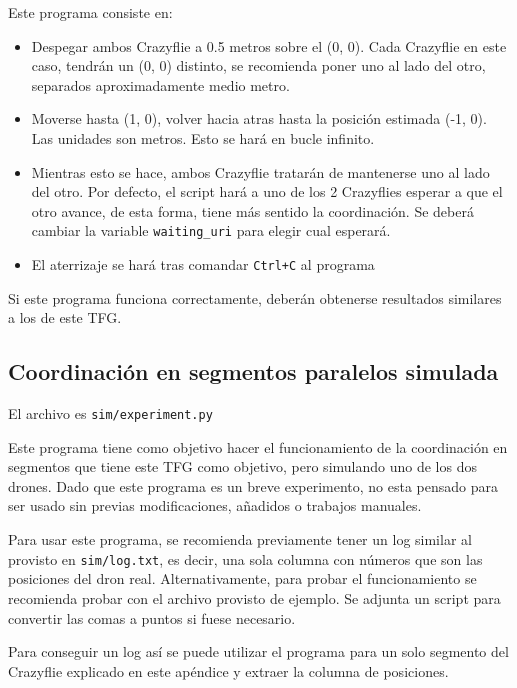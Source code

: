 Este programa consiste en:

\begin{itemize}
    \item Despegar ambos Crazyflie a 0.5 metros sobre el (0, 0). 
    Cada Crazyflie en este caso, tendrán un (0, 0) distinto, se recomienda poner uno al lado del otro, separados aproximadamente medio metro.
    \item Moverse hasta (1, 0), volver hacia atras hasta la posición estimada (-1, 0). 
    Las unidades son metros. Esto se hará en bucle infinito.
    \item Mientras esto se hace, ambos Crazyflie tratarán de mantenerse uno al lado del otro.
    Por defecto, el script hará a uno de los 2 Crazyflies esperar a que el otro avance, de esta forma, tiene más sentido la coordinación. 
    Se deberá cambiar la variable \texttt{waiting\_uri} para elegir cual esperará.
    \item El aterrizaje se hará tras comandar \texttt{Ctrl+C} al programa
\end{itemize}

Si este programa funciona correctamente, deberán obtenerse resultados similares a los de este TFG.

\subsection{Coordinación en segmentos paralelos simulada}

El archivo es \texttt{sim/experiment.py}

Este programa tiene como objetivo hacer el funcionamiento de la coordinación en segmentos 
que tiene este TFG como objetivo, pero simulando uno de los dos drones.
Dado que este programa es un breve experimento, 
no esta pensado para ser usado sin previas modificaciones, añadidos o trabajos manuales.

Para usar este programa, se recomienda previamente tener un log similar al provisto en \texttt{sim/log.txt},
es decir, una sola columna con números que son las posiciones del dron real.
Alternativamente, para probar el funcionamiento se recomienda probar con el archivo provisto de ejemplo.
Se adjunta un script para convertir las comas a puntos si fuese necesario.

Para conseguir un log así se puede utilizar el programa para un solo segmento del Crazyflie explicado en este apéndice y extraer la columna de posiciones.